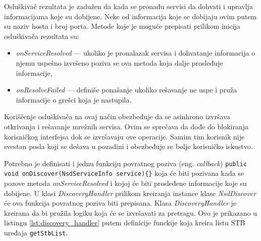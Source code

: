\documentclass[struktura.tex]{subfiles}
\begin{document}
Osluškivač rezultata je zadužen da kada se pronađu servisi da dohvati i upravlja informacijama koje su dobijene. Neke od informacija koje se dobijaju ovim putem su naziv hosta i broj porta. Metode koje je moguće prepisati prilikom inicija osluškivača rezultata su:
\begin{itemize}
    \item \textit{onServiceResolved} --- ukoliko je pronalazak servisa i dohvatanje informacija o njemu uspešno izvršeno poziva se ova metoda koja dalje prosleđuje informacije,
    \item \textit{onResolveFailed} --- definiše ponašanje ukoliko rešavanje ne uspe i pruža informacije o grešci koja je nastupila.
\end{itemize}

Koriščenje osluškivača na ovaj način obezbeđuje da se asinhrono izvršava otkrivanja i rešavanje mrežnih servisa. Ovim se sprečava da dođe do blokiranja korisničkog interfejsa dok se izvršavaju ove operacije. Samim tim korisnik nije svestan posla koji se dešava u pozadini i obezbeđuje se bolje korisničko iskustvo. 

Potrebno je definisati i jednu funkciju povratnog poziva (eng. \textit{callback}) \verb|public void onDiscover(NsdServiceInfo service){}| koja će biti pozivana kada se pozove metoda \textit{onServiceResolved} i kojoj će biti prosleđene informacije koje su dobijene.  U klasi \textit{DiscoveryHandler} prilikom kreiranja instance klase \textit{NsdDiscover} će ova funkcija povratnog poziva biti prepisana. Klasa \textit{DiscoveryHandler} je kreirana da bi pružila logiku koja će se izvršavati za pretragu. Ovo je prikazano u listingu \ref{lst:discovery_handler} putem definicije funckije koja kreira listu STB uređaja \verb|getStbList|.


\end{document}
